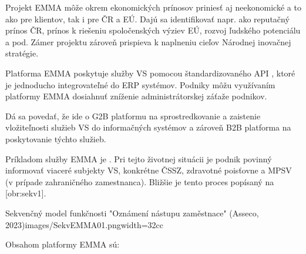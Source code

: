 
Projekt EMMA môže okrem ekonomických prínosov priniesť aj neekonomické a to ako pre klientov, tak i pre ČR a EÚ. Dajú sa identifikovať napr. ako reputačný prínos ČR, prínos k riešeniu spoločenských výziev EÚ, rozvoj ľudského potenciálu a pod. Zámer projektu zároveň prispieva k naplneniu cieľov Národnej inovačnej stratégie.

Platforma EMMA poskytuje služby VS pomocou štandardizovaného API
, ktoré je jednoducho integrovateľné do ERP systémov. Podniky môžu využívaním platformy EMMA dosiahnuť zníženie administrátorskej záťaže podnikov. 

Dá sa povedať, že ide o G2B platformu na sprostredkovanie a zaistenie vložiteľnosti služieb VS do informačných systémov a zároveň B2B platforma na poskytovanie týchto služieb.

Príkladom služby EMMA je . Pri tejto životnej situácii je podnik povinný informovať viaceré subjekty VS, konkrétne ČSSZ, zdravotné poisťovne a MPSV (v prípade zahraničného zamestnanca). Bližšie je tento proces popísaný na [obr:sekv1].

{Sekvenčný model funkčnosti "Oznámení nástupu zaměstnace" (Asseco, 2023)}{images/SekvEMMA01.png}{width=32cc}

Obsahom platformy EMMA sú:

